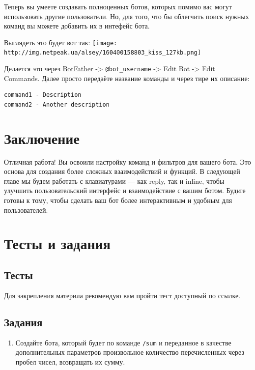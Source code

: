 \documentclass[
]{book}
\providecommand{\tightlist}{%
  \setlength{\itemsep}{0pt}\setlength{\parskip}{0pt}}
\begin{document}
Теперь вы умеете создавать полноценных ботов, которых помимо вас могут использовать другие пользователи. Но, для того, что бы облегчить поиск нужных команд вы можете добавить их в интефейс бота.

Выглядеть это будет вот так:
\texttt{[image: http://img.netpeak.ua/alsey/160400158803\_kiss\_127kb.png]}

Делается это через \href{@@BotFather}{BotFather} -\textgreater{} \texttt{@bot\_username} -\textgreater{} Edit Bot -\textgreater{} Edit Commands. Далее просто передаёте название команды и через тире их описание:

\begin{verbatim}
command1 - Description
command2 - Another description
\end{verbatim}

\section{Заключение}\label{ux437ux430ux43aux43bux44eux447ux435ux43dux438ux435-1}

Отличная работа! Вы освоили настройку команд и фильтров для вашего бота. Это основа для создания более сложных взаимодействий и функций. В следующей главе мы будем работать с клавиатурами --- как reply, так и inline, чтобы улучшить пользовательский интерфейс и взаимодействие с вашим ботом. Будьте готовы к тому, чтобы сделать ваш бот более интерактивным и удобным для пользователей.

\section{Тесты и задания}\label{ux442ux435ux441ux442ux44b-ux438-ux437ux430ux434ux430ux43dux438ux44f-1}

\subsection{Тесты}\label{ux442ux435ux441ux442ux44b-1}

Для закрепления материла рекомендую вам пройти тест доступный по \href{https://onlinetestpad.com/t/build-tg-bot-in-r-2}{ссылке}.

\subsection{Задания}\label{ux437ux430ux434ux430ux43dux438ux44f-1}

\begin{enumerate}
\def\labelenumi{\arabic{enumi}.}
\tightlist
\item
  Создайте бота, который будет по команде \texttt{/sum} и переданное в качестве дополнительных параметров произвольное количество перечисленных через пробел чисел, возвращать их сумму.
\end{enumerate}
\end{document}
